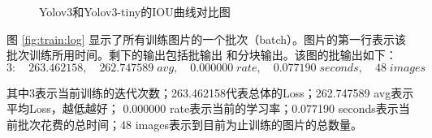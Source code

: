 \begin{figure}[t]
    \centering
    \caption{Yolov3和Yolov3-tiny的IOU曲线对比图}
    \label{fig:IOU}
\end{figure}

图 \ref{fig:train:log} 显示了所有训练图片的一个批次（batch）。图片的第一行表示该批次训练所用时间。剩下的输出包括批输出
和分块输出。该图的批输出如下：
$$3: \quad 263.462158,\quad 262.747589 \; avg,\quad  0.000000 \; rate, \quad 0.077190 \; seconds, \quad 48 \; images$$

其中3表示当前训练的迭代次数；263.462158代表总体的Loss；262.747589 avg表示平均Loss，越低越好；
0.000000 rate表示当前的学习率；0.077190 seconds表示当前批次花费的总时间；48 images表示到目前为止训练的图片的总数量。


